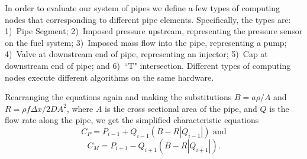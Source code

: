 In order to evaluate our system of pipes we define a few types of computing nodes that corresponding to different pipe elements.  Specifically, the types are:
1)~Pipe Segment;
2)~Imposed pressure upstream, representing the pressure sensor on the fuel system;
3)~Imposed mass flow into the pipe, representing a pump;
4)~Valve at downstream end of pipe, representing an injector;
5)~Cap at downstream end of pipe;
and 6)~``T" intersection.
%
Different types of computing nodes execute different algorithms on the same hardware.  

Rearranging the equations again and making the substitutions \(B = a\rho / A\) and \( R=\rho f \Delta x/2DA^2\), where \(A\) is the cross sectional area of the pipe, and \(Q\) is the flow rate along the pipe, we get the simplified characteristic equations
%
\begin{equation}
C_P=P_{i-1}+Q_{i-1}\left(B-R|Q_{i-1}|\right) \text{ and}
\end{equation}
%
\begin{equation}
C_M=P_{i+1}-Q_{i+1}\left(B-R|Q_{i+1}|\right).
\end{equation}
%
%
%

